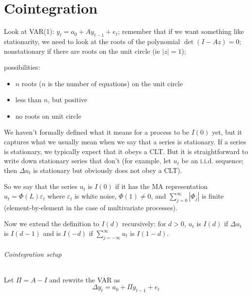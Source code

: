 

\part*{Cointegration}

Look at VAR(1): $y_t = a_0 + A y_{t-1} + e_t$; remember that if we
want something like stationarity, we need to look at the roots of the
polynomial $\det(I - A z) = 0$; nonstationary if there are roots on
the unit circle (ie $|z| = 1$);

possibilities:
\begin{itemize}
\item $n$ roots ($n$ is the number of equations) on the unit circle
\item less than $n$, but positive
\item no roots on unit circle
\end{itemize}

We haven't formally defined what it means for a process to be $I(0)$
yet, but it captures what we usually mean when we say that a series is
stationary.  If a series is stationary, we typically expect that it
obeys a CLT.  But it is straightforward to write down stationary
series that don't (for example, let $u_t$ be an i.i.d. sequence; then
$Δu_t$ is stationary but obviously does not obey a CLT).

So we say that the series $u_t$ is $I(0)$ if it has the MA
representation $u_t = Φ(L) ε_t$ where $ε_t$ is white noise, $Φ(1) ≠
0$, and $∑_{j=0}^∞ | Φ_j |$ is finite (element-by-element in the case
of multivariate processes).

Now we extend the definition to $I(d)$ recursively: for $d > 0$, $u_t$
is $I(d)$ if $Δu_t$ is $I(d-1)$ and is $I(-d)$ if $∑_{j=-∞}^∞ u_t$ is
$I(1-d)$.

\paragraph{Cointegration setup}
Let $Π = A - I$ and rewrite the VAR as
\[Δ y_t = a_0 + Π y_{t-1} + e_t\]

